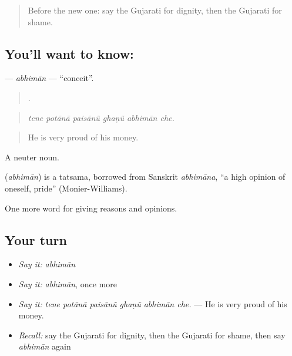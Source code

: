 \label{lesson:GU-C359-abhiman}



\begin{quote}
Before the new one: say the Gujarati for dignity, then the Gujarati for shame.
\end{quote}

\subsection*{You'll want to know: }
\textbf{} — \emph{abhimān} — \textquotedblleft{}conceit\textquotedblright{}.

\begin{quote}
     .
\end{quote}

\begin{quote}
\emph{tene potānā paisānũ ghaṇũ abhimān che.}
\end{quote}

\begin{quote}
He is very proud of his money.
\end{quote}

A neuter noun.

\begin{cousinweb}
\textbf{} (\emph{abhimān}) is a tatsama, borrowed from Sanskrit \emph{abhimāna}, \textquotedblleft{}a high opinion of oneself, pride\textquotedblright{} (Monier-Williams).
\end{cousinweb}

\begin{grammarlens}[title={What you've built}]
One more word for giving reasons and opinions.
\end{grammarlens}

\subsection*{Your turn}
\begin{itemize}
\raggedright
  \item \emph{Say it:} \emph{abhimān}
  \item \emph{Say it:} \emph{abhimān}, once more
  \item \emph{Say it:} \emph{tene potānā paisānũ ghaṇũ abhimān che.} — He is very proud of his money.
  \item \emph{Recall:} say the Gujarati for dignity, then the Gujarati for shame, then say \emph{abhimān} again
\end{itemize}

